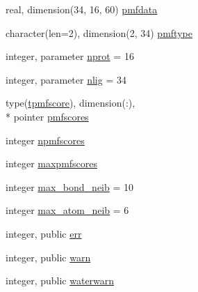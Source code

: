 \begin{DoxyCompactItemize}
\item 
real, dimension(34, 16, 60) \hyperlink{classcalc__pmf_ae432aff45faf03e082c4198c866338c7}{pmfdata}
\item 
character(len=2), dimension(2, 34) \hyperlink{classcalc__pmf_a3030635839201df076cd664a13396090}{pmftype}
\item 
integer, parameter \hyperlink{classcalc__pmf_ad041cf7ee1dada3fb4d2be26d5894efd}{nprot} = 16
\item 
integer, parameter \hyperlink{classcalc__pmf_a42d85dcb1905a89a8601514bd24a120a}{nlig} = 34
\item 
type(\hyperlink{structcalc__pmf_1_1tpmfscore}{tpmfscore}), dimension(\-:), \\*
pointer \hyperlink{classcalc__pmf_a908cf718c661183b9069614dad8c3ddd}{pmfscores}
\item 
integer \hyperlink{classcalc__pmf_ab503cd9dec507e951441afa3c867d4f9}{npmfscores}
\item 
integer \hyperlink{classcalc__pmf_ab0dd5e34df9ec5a11fc98c04b6a634de}{maxpmfscores}
\item 
integer \hyperlink{classcalc__pmf_a3ec37f70413f821e8521c6368ed69f24}{max\-\_\-bond\-\_\-neib} = 10
\item 
integer \hyperlink{classcalc__pmf_a2a1e733c9f112f18e86ac8654f47f873}{max\-\_\-atom\-\_\-neib} = 6
\item 
integer, public \hyperlink{classcalc__pmf_aa3f01647c31f0a6aabfa5e04841d826b}{err}
\item 
integer, public \hyperlink{classcalc__pmf_a3f47ac8c9ec9c4a161656939a6dce7af}{warn}
\item 
integer, public \hyperlink{classcalc__pmf_a3b88bd9f8668a6e062604271a4113c99}{waterwarn}
\end{DoxyCompactItemize}
